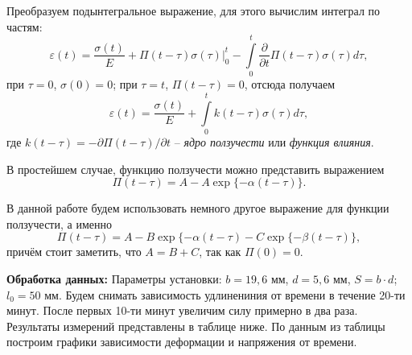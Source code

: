 \documentclass[a4paper,12pt]{article}
\begin{document}
Преобразуем подынтегральное выражение, для этого вычислим интеграл по частям:
\[\varepsilon (t) = \frac{\sigma (t)}{E} + \Pi (t - \tau) \sigma (\tau)\bigg|_0^t - \int\limits_0^t \frac{\partial}{\partial t} \Pi (t - \tau) \sigma (\tau) d\tau,\]
при $\tau = 0$, $\sigma (0) = 0$; при $\tau = t$, $\Pi (t - \tau) = 0$, отсюда получаем
\[\varepsilon (t) = \frac{\sigma (t)}{E} + \int\limits_0^t k(t - \tau) \sigma (\tau) d\tau,\]
где $k(t - \tau) = - \partial \Pi (t - \tau) / \partial t$ -- \textit{ядро ползучести} или \textit{функция влияния}.

В простейшем случае, функцию ползучести можно представить выражением 
\[\Pi (t - \tau) = A - A \exp\{-\alpha (t - \tau)\}.\]

В данной работе будем использовать немного другое выражение для функции ползучести, а именно
\[\Pi (t - \tau) = A - B \exp\{-\alpha (t - \tau) - C \exp\{-\beta (t - \tau)\},\]
причём стоит заметить, что $A = B + C$, так как $\Pi (0) = 0$.

\textbf{Обработка данных:} Параметры установки: $b = 19,6$ мм, $d = 5,6$ мм, $S = b \cdot d$; $l_0 = 50$ мм. Будем снимать зависимость удлинениния от времени в течение 20-ти минут. После первых 10-ти минут увеличим силу примерно в два раза. Результаты измерений представлены в таблице ниже. По данным из таблицы построим графики зависимости деформации и напряжения от времени.
\end{document}
